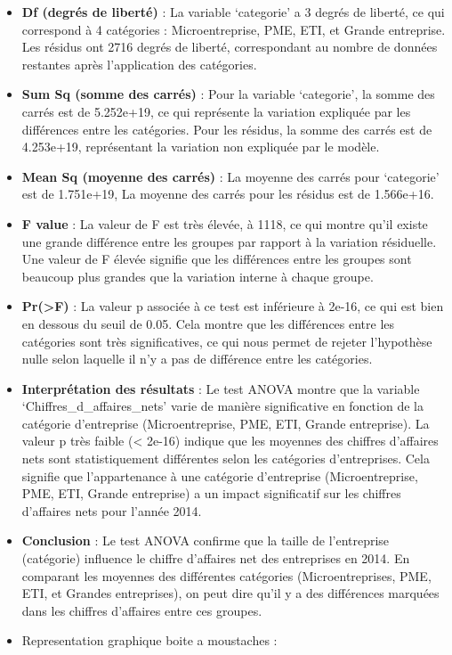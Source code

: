 \documentclass[mstat,12pt]{unswthesis}
\begin{document}
\begin{itemize}
\item
  \textbf{Df (degrés de liberté)} : La variable `categorie' a 3 degrés
  de liberté, ce qui correspond à 4 catégories : Microentreprise, PME,
  ETI, et Grande entreprise. Les résidus ont 2716 degrés de liberté,
  correspondant au nombre de données restantes après l'application des
  catégories.
\item
  \textbf{Sum Sq (somme des carrés)} : Pour la variable `categorie', la
  somme des carrés est de 5.252e+19, ce qui représente la variation
  expliquée par les différences entre les catégories. Pour les résidus,
  la somme des carrés est de 4.253e+19, représentant la variation non
  expliquée par le modèle.
\item
  \textbf{Mean Sq (moyenne des carrés)} : La moyenne des carrés pour
  `categorie' est de 1.751e+19, La moyenne des carrés pour les résidus
  est de 1.566e+16.
\item
  \textbf{F value} : La valeur de F est très élevée, à 1118, ce qui
  montre qu'il existe une grande différence entre les groupes par
  rapport à la variation résiduelle. Une valeur de F élevée signifie que
  les différences entre les groupes sont beaucoup plus grandes que la
  variation interne à chaque groupe.
\item
  \textbf{Pr(\textgreater F)} : La valeur p associée à ce test est
  inférieure à 2e-16, ce qui est bien en dessous du seuil de 0.05. Cela
  montre que les différences entre les catégories sont très
  significatives, ce qui nous permet de rejeter l'hypothèse nulle selon
  laquelle il n'y a pas de différence entre les catégories.
\item
  \textbf{Interprétation des résultats} : Le test ANOVA montre que la
  variable `Chiffres\_d\_affaires\_nets' varie de manière significative
  en fonction de la catégorie d'entreprise (Microentreprise, PME, ETI,
  Grande entreprise). La valeur p très faible (\textless{} 2e-16)
  indique que les moyennes des chiffres d'affaires nets sont
  statistiquement différentes selon les catégories d'entreprises. Cela
  signifie que l'appartenance à une catégorie d'entreprise
  (Microentreprise, PME, ETI, Grande entreprise) a un impact
  significatif sur les chiffres d'affaires nets pour l'année 2014.
\item
  \textbf{Conclusion} : Le test ANOVA confirme que la taille de
  l'entreprise (catégorie) influence le chiffre d'affaires net des
  entreprises en 2014. En comparant les moyennes des différentes
  catégories (Microentreprises, PME, ETI, et Grandes entreprises), on
  peut dire qu'il y a des différences marquées dans les chiffres
  d'affaires entre ces groupes.
\item
  Representation graphique boite a moustaches :
\end{itemize}
\end{document}
